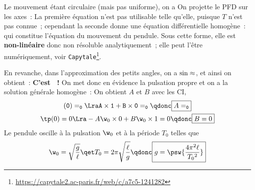 \documentclass[../../main/main.tex]{subfiles}
\begin{document}
\begin{minipage}{0.25\linewidth}
\begin{center}
{		}
		\vspace{-15pt}
	\end{center}
\end{minipage}
\begin{enumerate}[label=\sqenumi, start=4]
	\psw{
		\[
			\begin{array}{ll}
				\textbf{Poids}   & \Pf = m\gf = mg(\cos\tt \ur - \sin\tt \ut)
				\\
				\textbf{Tension} & \Tf = -T\ur
			\end{array}
		\]
	}
	\psw{
		\[m\af = \Pf + \Tf\]
	}
	Le mouvement étant circulaire (mais pas uniforme), on a
	\psw{
		\[\af = -\ell\tp^2 \ur + \ell\tpp \ut\]
	}
	 On projette le PFD sur les axes~:
	\psw{
		\[
			\left\{
			\begin{array}{rcl}
				-m\ell\tp^2 & = & mg\cos\tt - T \\
				m\ell\tpp   & = & -mg\sin\tt
			\end{array}
			\right.
		\]
	}
	 La première équation n'est pas utilisable telle qu'elle,
	puisque $T$ n'est pas connue~; cependant la seconde donne une équation
	différentielle homogène~:
	\psw{
		\[\boxed{\tpp + \frac{g}{\ell}\sin\tt = 0}\]
	}
	qui constitue l'équation du mouvement du pendule. Sous cette forme, elle
	est \textbf{non-linéaire} donc non résoluble analytiquement~; elle peut
	l'être numériquement, voir
	\texttt{Capytale}\footnote{\url{
			https://capytale2.ac-paris.fr/web/c/a7c5-1241282}}.
\end{enumerate}
En revanche, dans l'approximation des petits angles, on a $\sin\tt\approx\tt$,
et ainsi on obtient~:
\psw{
	\[\boxed{\tpp + \frac{g}{\ell}\tt = 0}\]
}
\textbf{C'est ~!} On
met donc en évidence la pulsation propre
\psw{
	\[\w_0 = \sqrt{\frac{g}{\ell}}\]
}
et on a la solution générale homogène~:
\psw{
	\[\tt(t) = A\cos(\w_0t) + B\sin(\w_0t)\]
}
On obtient $A$ et $B$ avec les CI,
\begin{gather*}
	\tt(0) = \tt_0
	\Lra A\times 1 + B\times 0 = \tt_0
	\qdonc
	\boxed{A = \tt_0}\\
	\tp(0) = 0
	\Lra -A\w_0\times 0 + B\w_0\times 1 = 0
	\qdonc
	\boxed{B = 0}
\end{gather*}
Le pendule oscille à la pulsation $\w_0$ et à la période $T_0$ telles que
\[
	\w_0 = \sqrt{\frac{g}{\ell}}
	\qet
	T_0 = 2\pi \sqrt{\frac{\ell}{g}}
	\qdonc
	\boxed{g = \psw{\frac{4\pi^2\ell}{T_0{}^2}}}
\]
\end{document}
